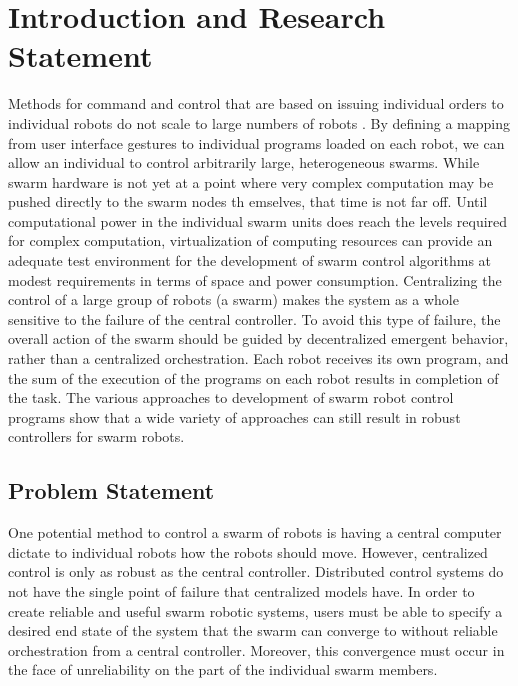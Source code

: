 \chapter{Introduction and Research Statement}

Methods for command and control that are based on issuing individual orders to individual robots do not scale to large numbers of robots \citep{WangSearchScale}.
By defining a mapping from user interface gestures to individual programs loaded on each robot, we can allow an individual to control arbitrarily large, heterogeneous swarms.
While swarm hardware is not yet at a point where very complex computation may be pushed directly to the swarm nodes th emselves, that time is not far off. 
Until computational power in the individual swarm units does reach the levels required for complex computation, virtualization of computing resources can provide an adequate test environment for the development of swarm control algorithms at modest requirements in terms of space and power consumption. 
Centralizing the control of a large group of robots (a swarm) makes the system as a whole sensitive to the failure of the central controller. 
To avoid this type of failure, the overall action of the swarm should be guided by decentralized emergent behavior, rather than a centralized orchestration. 
Each robot receives its own program, and the sum of the execution of the programs on each robot results in completion of the task.
The various approaches to development of swarm robot control programs show that a wide variety of approaches can still result in robust controllers for swarm robots. 

\section{Problem Statement}

One potential method to control a swarm of robots is having a central computer dictate to individual robots how the robots should move.
However, centralized control is only as robust as the central controller. 
Distributed control systems do not have the single point of failure that centralized models have. 
In order to create reliable and useful swarm robotic systems, users must be able to specify a desired end state of the system that the swarm can converge to without reliable orchestration from a central controller. 
Moreover, this convergence must occur in the face of unreliability on the part of the individual swarm members. 

